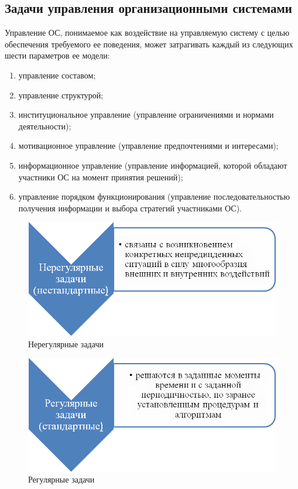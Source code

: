 \documentclass[a4paper,12pt,oneside,final]{extarticle}
\makeatletter
\numberwithin{equation}{section}
\def\maxwidth#1{\ifdim\Gin@nat@width>#1 #1\else\Gin@nat@width\fi}
\makeatother
\begin{document}
\subsection{Задачи управления организационными системами}
Управление ОС, понимаемое как воздействие на управляемую систему с целью обеспечения требуемого ее поведения, может затрагивать каждый из следующих шести параметров ее модели:
\begin{enumerate}
	\item управление составом;
	\item управление структурой;
	\item институциональное управление (управление ограничениями и нормами деятельности);
	\item мотивационное управление (управление предпочте­ниями и интересами);
	\item информационное управление (управление информацией, ко­торой обладают участники ОС на момент принятия решений);
	\item управление порядком функционирования (управление последовательностью получения информации и выбора стратегий участниками ОС).
\end{enumerate}
\begin{figure}[h]
	\centering
	\includegraphics[width=\maxwidth{\textwidth}]{management-figures/non_regular_organization_management_tasks}
	\caption{Нерегулярные задачи}
\end{figure}
\begin{figure}[h]
	\centering
	\includegraphics[width=\maxwidth{\textwidth}]{management-figures/regular_organization_management_tasks}
	\caption{Регулярные задачи}
\end{figure}
\end{document}
